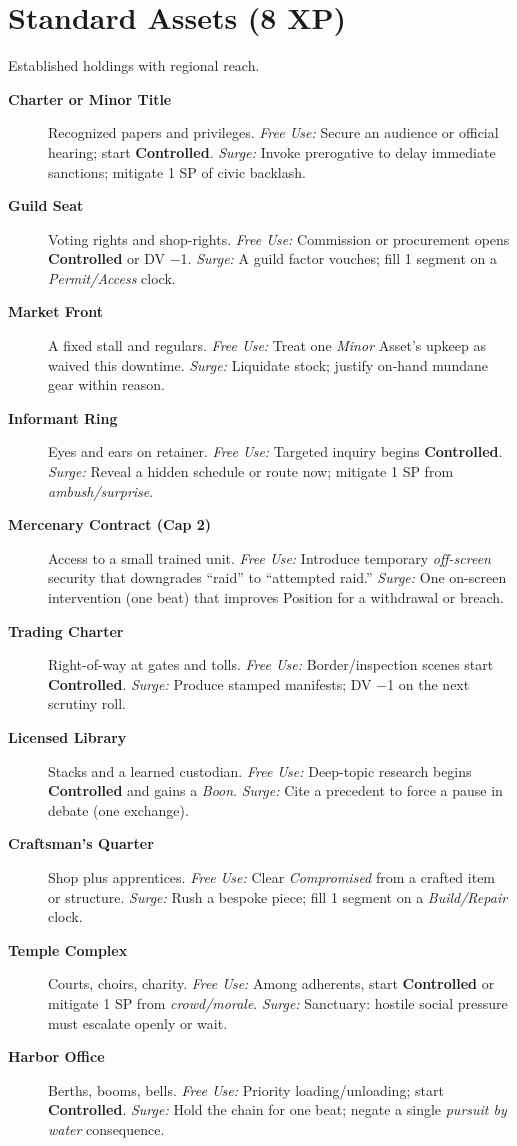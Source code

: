 \section{Standard Assets (8 XP)}
Established holdings with regional reach.
\begin{description}
  \item[\textbf{Charter or Minor Title}]  Recognized papers and privileges. \emph{Free Use:} Secure an audience or official hearing; start \textbf{Controlled}. \emph{Surge:} Invoke prerogative to delay immediate sanctions; mitigate 1 SP of civic backlash.
  \item[\textbf{Guild Seat}]  Voting rights and shop-rights. \emph{Free Use:} Commission or procurement opens \textbf{Controlled} or DV −1. \emph{Surge:} A guild factor vouches; fill 1 segment on a \emph{Permit/Access} clock.
  \item[\textbf{Market Front}]  A fixed stall and regulars. \emph{Free Use:} Treat one \emph{Minor} Asset’s upkeep as waived this downtime. \emph{Surge:} Liquidate stock; justify on-hand mundane gear within reason.
  \item[\textbf{Informant Ring}]  Eyes and ears on retainer. \emph{Free Use:} Targeted inquiry begins \textbf{Controlled}. \emph{Surge:} Reveal a hidden schedule or route now; mitigate 1 SP from \emph{ambush/surprise}.
  \item[\textbf{Mercenary Contract (Cap 2)}]  Access to a small trained unit. \emph{Free Use:} Introduce temporary \emph{off-screen} security that downgrades “raid” to “attempted raid.” \emph{Surge:} One on-screen intervention (one beat) that improves Position for a withdrawal or breach.
  \item[\textbf{Trading Charter}]  Right-of-way at gates and tolls. \emph{Free Use:} Border/inspection scenes start \textbf{Controlled}. \emph{Surge:} Produce stamped manifests; DV −1 on the next scrutiny roll.
  \item[\textbf{Licensed Library}]  Stacks and a learned custodian. \emph{Free Use:} Deep-topic research begins \textbf{Controlled} and gains a \emph{Boon}. \emph{Surge:} Cite a precedent to force a pause in debate (one exchange).
  \item[\textbf{Craftsman’s Quarter}]  Shop plus apprentices. \emph{Free Use:} Clear \emph{Compromised} from a crafted item or structure. \emph{Surge:} Rush a bespoke piece; fill 1 segment on a \emph{Build/Repair} clock.
  \item[\textbf{Temple Complex}]  Courts, choirs, charity. \emph{Free Use:} Among adherents, start \textbf{Controlled} or mitigate 1 SP from \emph{crowd/morale}. \emph{Surge:} Sanctuary: hostile social pressure must escalate openly or wait.
  \item[\textbf{Harbor Office}]  Berths, booms, bells. \emph{Free Use:} Priority loading/unloading; start \textbf{Controlled}. \emph{Surge:} Hold the chain for one beat; negate a single \emph{pursuit by water} consequence.
\end{description}

